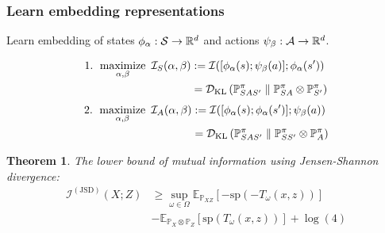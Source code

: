 \documentclass[10pt,mathserif]{beamer}
\newtheorem{thm}{Theorem}
\begin{document}

\begin{frame}
\frametitle{Learn embedding representations}

Learn embedding of states $\phi_\alpha : \mathcal{S} \rightarrow \mathbb R^d$ and actions $\psi_\beta: \mathcal{A} \rightarrow \mathbb R^d$.

\begin{align}
\text{1. }\operatorname*{maximize}_{\alpha, \beta}~ \mathcal{I}_S(\alpha, \beta) &:= \mathcal{I}([\phi_\alpha(s); \psi_\beta(a)]; \phi_\alpha(s')) \nonumber \\
&= \mathcal{D}_{\text{KL}}\left(\mathbb{P}_{SAS'}^\pi \parallel \mathbb{P}_{SA}^\pi \otimes \mathbb{P}_{S'}^\pi\right) \nonumber
\end{align}\pause
\vspace{-1em}
\begin{align}
\text{2. }\operatorname*{maximize}_{\alpha, \beta}~ \mathcal{I}_A(\alpha, \beta) &:= \mathcal{I}([\phi_\alpha(s); \phi_\alpha(s')]; \psi_\beta(a)) \nonumber \\
&= \mathcal{D}_{\text{KL}}\left(\mathbb{P}_{SAS'}^\pi \parallel \mathbb{P}_{SS'}^\pi \otimes \mathbb{P}_A^\pi\right) \nonumber
\end{align}

\end{frame}

\begin{frame}
\begin{thm}\label{thm:emi_js}
The lower bound of mutual information using Jensen-Shannon divergence:
\begin{align*}
    \mathcal{I}^{(\text{JSD})}(X; Z) &\geq \sup_{\omega \in \Omega} 
    \mathbb{E}_{\mathbb{P}_{XZ}} \left[-\text{sp} \left(-T_{\omega}(x,z)\right)\right] \\
    & - \mathbb{E}_{\mathbb{P}_{X} \otimes \mathbb{P}_Z} \left[ \text{sp} \left(T_{\omega}(x,z)\right)\right]+\log(4)
\end{align*}
\end{thm}
\end{frame}

\end{document}

